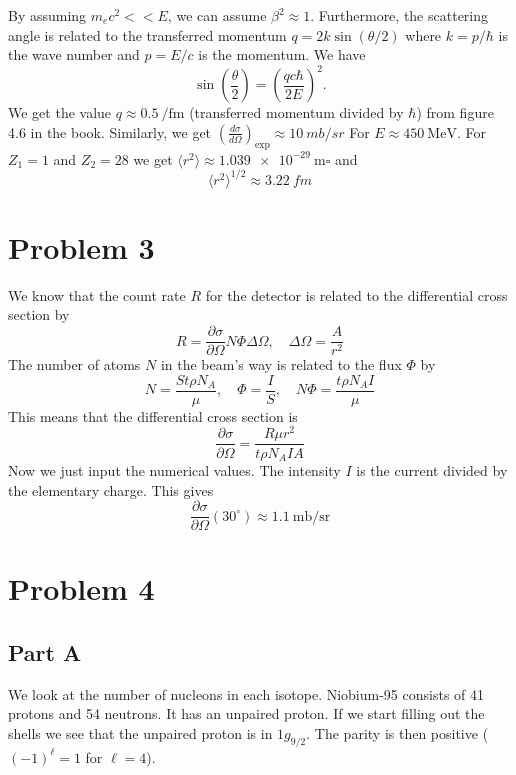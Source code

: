 \documentclass[a4paper, parskip=half, twopage]{scrartcl}
\newcommand{\pd}[2]{\frac {\partial #1}{\partial #2}}
\begin{document}
By assuming $m_e c^2 << E$, we can assume $\beta^2 \approx 1$. Furthermore, the scattering angle is related to the transferred momentum $q = 2k\sin\left( \theta /2 \right)$ where $k = p/\hbar$ is the wave number and $p = E/c$ is the momentum. We have
\[
\sin\left( \frac{\theta}{2} \right) = \left( \frac{qc\hbar}{2E} \right)^2 .
\]
We get the value $q \approx \SI{0.5}{\per\femto\metre}$  (transferred momentum divided by $\hbar$) from figure 4.6 in the book. Similarly, we get $\left( \frac{d \sigma}{d \Omega} \right)_\text{exp} \approx \SI{10}{mb\per sr}$ For $E \approx \SI{450}{\MeV}$. For $Z_1 = 1$ and $Z_2 = 28$ we get $\langle r^2\rangle \approx \SI{1.039e-29}{\meter\square}$ and
\[
\langle r^2 \rangle^{1/2} \approx \SI{3.22}{fm}
\]
\section*{Problem 3}

We know that the count rate $R$ for the detector is related to the differential cross section by
\[
R = \pd{\sigma}{\Omega} N \Phi {\Delta\Omega}, \quad \Delta\Omega = \frac{A}{r^2}
\]
The number of  atoms $N$ in the beam's way is related to the flux $\Phi$ by
\[
N = \frac{S t \rho N_A}{\mu}, \quad \Phi = \frac{I}{S}, \quad N \Phi = \frac{t \rho N_A I}{\mu}
\]
This means that the differential cross section is
\[
\pd{\sigma}{\Omega} = \frac{R \mu r^2}{t \rho N_A I A}
\]
Now we just input the numerical values. The intensity $I$ is the current divided by the elementary charge. This gives
\[
\pd{\sigma}{\Omega} (30^\circ) \approx \SI{1.1}{\milli\barn\per\steradian}
\]
\section*{Problem 4}

\subsection*{Part A}

We look at the number of nucleons in each isotope. Niobium-95 consists of 41 protons and 54 neutrons. It has an unpaired proton. If we start filling out the shells we see that the unpaired proton is in $1g_{9/2}$. The parity is then positive ($(-1)^\ell = 1$ for $\ell = 4$).
\end{document}
